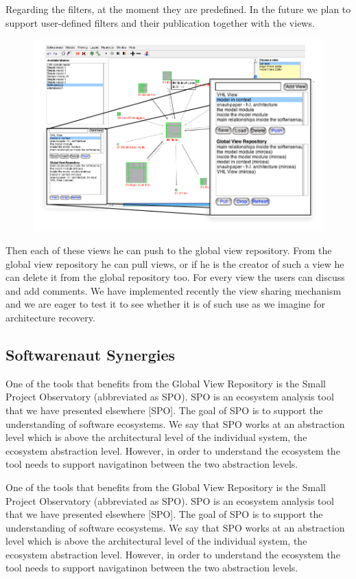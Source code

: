 \documentclass[preprint,12pt]{elsarticle}
\begin{document}
Regarding the filters, at the moment they are predefined. In the future we plan to support user-defined filters and their publication together with the views. 


\begin{figure}[h]
\begin{center}
\includegraphics[width=0.8\linewidth]{images/ViewOperations.pdf}
\caption{}
\end{center}
\end{figure}



Then each of these views he can push to the global view repository. From the global view repository he can pull views, or if he is the creator of such a view he can delete it from the global repository too. For every view the users can discuss and add comments. We have implemented recently the view sharing mechanism and we are eager to test it to see whether it is of such use as we imagine for architecture recovery. 

\subsection {Softwarenaut Synergies}
One of the tools that benefits from the Global View Repository is the Small Project Observatory (abbreviated as SPO). SPO is an ecosystem analysis tool that we have presented elsewhere [SPO]. The goal of SPO is to support the understanding of software ecosystems. We say that SPO works at an abstraction level which is above the architectural level of the individual system, the ecosystem abstraction level. However, in order to understand the  ecosystem the tool needs to support navigatinon between the two abstraction levels. 

One of the tools that benefits from the Global View Repository is the Small Project Observatory (abbreviated as SPO). SPO is an ecosystem analysis tool that we have presented elsewhere [SPO]. The goal of SPO is to support the understanding of software ecosystems. We say that SPO works at an abstraction level which is above the architectural level of the individual system, the ecosystem abstraction level. However, in order to understand the  ecosystem the tool needs to support navigatinon between the two abstraction levels. 
\end{document}

